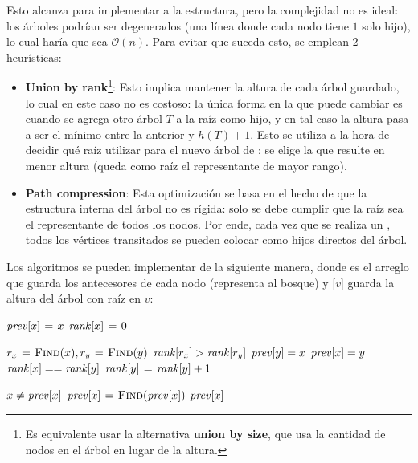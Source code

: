 \documentclass[a4paper]{report}
\newcommand{\BigO}[1]{\ensuremath{\mathcal{O}(#1)}}
\begin{document}
Esto alcanza para implementar a la estructura, pero la complejidad no es ideal: los árboles podrían ser degenerados (una línea donde cada nodo tiene $1$ solo hijo), lo cual haría que  sea \BigO{n}. Para evitar que suceda esto, se emplean 2 heurísticas:
\begin{itemize}
    \item \textbf{Union by rank}\footnote{Es equivalente usar la alternativa \textbf{union by size}, que usa la cantidad de nodos en el árbol en lugar de la altura.}: Esto implica mantener la altura de cada árbol guardado, lo cual en este caso no es costoso: la única forma en la que puede cambiar es cuando se agrega otro árbol $T$ a la raíz como hijo, y en tal caso la altura pasa a ser el mínimo entre la anterior y $h(T) + 1$. Esto se utiliza a la hora de decidir qué raíz utilizar para el nuevo árbol de : se elige la que resulte en menor altura (queda como raíz el representante de mayor rango).
    \item \textbf{Path compression}: Esta optimización se basa en el hecho de que la estructura interna del árbol no es rígida: solo se debe cumplir que la raíz sea el representante de todos los nodos. Por ende, cada vez que se realiza un , todos los vértices transitados se pueden colocar como hijos directos del árbol.
\end{itemize}

Los algoritmos se pueden implementar de la siguiente manera, donde  es el arreglo que guarda los antecesores de cada nodo (representa al bosque) y [$v$] guarda la altura del árbol con raíz en $v$:
\begin{codebox}
    \li $\id{prev}[x] \gets x$
    \li $\id{rank}[x] \gets 0$
\end{codebox}
\begin{codebox}
    \li $r_x \mathrel{\hspace{1pt}=\hspace{1pt}} \textnormal{\scshape Find}(x), r_y \mathrel{\hspace{1pt}=\hspace{1pt}} \textnormal{\scshape Find}(y)$
    \li \If $\id{rank}[r_x] > \id{rank}[r_y]$ \Then
    \li $\id{prev}[y] = x$
    \li \Else
    \li $\id{prev}[x] = y$
    \li \If $\id{rank}[x] == \id{rank}[y]$ \Then
    \li $\id{rank}[y] \gets \id{rank}[y] + 1$
    \End
    \End
\end{codebox}
\begin{codebox}
    \li \If $x \neq \id{prev}[x]$ \Then
    \li $\id{prev}[x] \gets \proc{Find}(\id{prev}[x])$
    \End
    \li \Return $\id{prev}[x]$
\end{codebox}
\end{document}
